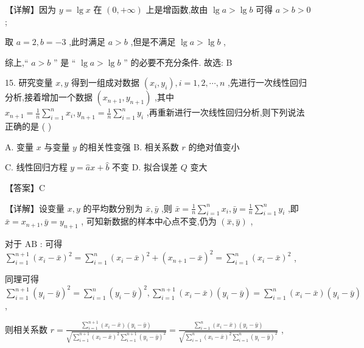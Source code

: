 \documentclass[10pt]{article}
\begin{document}
【详解】因为 \(y = \lg x\) 在 \(\left( {0, + \infty }\right)\) 上是增函数,故由 \(\lg a > \lg b\) 可得 \(a > b > 0\) ;

取 \(a = 2,b =  - 3\) ,此时满足 \(a > b\) ,但是不满足 \(\lg a > \lg b\) ,

综上,“ \(a > b\) ” 是 “ \(\lg a > \lg b\) ” 的必要不充分条件. 故选: B

15. 研究变量 \(x,y\) 得到一组成对数据 \(\left( {{x}_{i},{y}_{i}}\right) ,i = 1,2,\cdots ,n\) ,先进行一次线性回归分析,接着增加一个数据 \(\left( {{x}_{n + 1},{y}_{n + 1}}\right)\) ,其中 \({x}_{n + 1} = \frac{1}{n}\mathop{\sum }\limits_{{i = 1}}^{n}{x}_{i},{y}_{n + 1} = \frac{1}{n}\mathop{\sum }\limits_{{i = 1}}^{n}{y}_{i}\) ,再重新进行一次线性回归分析,则下列说法正确的是 ( )

A. 变量 \(x\) 与变量 \(y\) 的相关性变强 B. 相关系数 \(r\) 的绝对值变小

C. 线性回归方程 \(y = \widehat{a}x + \widehat{b}\) 不变 D. 拟合误差 \(Q\) 变大

【答案】C

【详解】设变量 \(x,y\) 的平均数分别为 \(\bar{x},\bar{y}\) ,则 \(\bar{x} = \frac{1}{n}\mathop{\sum }\limits_{{i = 1}}^{n}{x}_{i},\bar{y} = \frac{1}{n}\mathop{\sum }\limits_{{i = 1}}^{n}{y}_{i}\) ,即 \(\bar{x} = {x}_{n + 1},\bar{y} = {y}_{n + 1}\) , 可知新数据的样本中心点不变,仍为 \(\left( {\overset{ - }{x},\overset{ - }{y}}\right)\) ,

对于 \(\mathrm{{AB}}\) : 可得 \(\mathop{\sum }\limits_{{i = 1}}^{{n + 1}}{\left( {x}_{i} - \bar{x}\right) }^{2} = \mathop{\sum }\limits_{{i = 1}}^{n}{\left( {x}_{i} - \bar{x}\right) }^{2} + {\left( {x}_{n + 1} - \bar{x}\right) }^{2} = \mathop{\sum }\limits_{{i = 1}}^{n}{\left( {x}_{i} - \bar{x}\right) }^{2}\) ,

同理可得 \(\mathop{\sum }\limits_{{i = 1}}^{{n + 1}}{\left( {y}_{i} - \bar{y}\right) }^{2} = \mathop{\sum }\limits_{{i = 1}}^{n}{\left( {y}_{i} - \bar{y}\right) }^{2},\mathop{\sum }\limits_{{i = 1}}^{{n + 1}}\left( {{x}_{i} - \bar{x}}\right) \left( {{y}_{i} - \bar{y}}\right)  = \mathop{\sum }\limits_{{i = 1}}^{n}\left( {{x}_{i} - \bar{x}}\right) \left( {{y}_{i} - \bar{y}}\right)\) ,

则相关系数 \(r = \frac{\mathop{\sum }\limits_{{i = 1}}^{{n + 1}}\left( {{x}_{i} - \bar{x}}\right) \left( {{y}_{i} - \bar{y}}\right) }{\sqrt{\mathop{\sum }\limits_{{i = 1}}^{{n + 1}}{\left( {x}_{i} - \bar{x}\right) }^{2}\mathop{\sum }\limits_{{i = 1}}^{{n + 1}}{\left( {y}_{i} - \bar{y}\right) }^{2}}} = \frac{\mathop{\sum }\limits_{{i = 1}}^{n}\left( {{x}_{i} - \bar{x}}\right) \left( {{y}_{i} - \bar{y}}\right) }{\sqrt{\mathop{\sum }\limits_{{i = 1}}^{n}{\left( {x}_{i} - \bar{x}\right) }^{2}\mathop{\sum }\limits_{{i = 1}}^{n}{\left( {y}_{i} - \bar{y}\right) }^{2}}}\) ,
\end{document}
